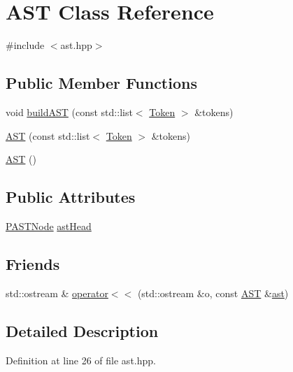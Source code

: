 \hypertarget{class_a_s_t}{}\section{A\+S\+T Class Reference}
\label{class_a_s_t}


{\ttfamily \#include $<$ast.\+hpp$>$}

\subsection*{Public Member Functions}
\begin{DoxyCompactItemize}
\item 
void \hyperlink{class_a_s_t_a8fe6207ce46b87c2febdc6ebdf0be6dd}{build\+A\+S\+T} (const std\+::list$<$ \hyperlink{struct_token}{Token} $>$ \&tokens)
\item 
\hyperlink{class_a_s_t_a2daa6c636071ad4e888897a93e3dd380}{A\+S\+T} (const std\+::list$<$ \hyperlink{struct_token}{Token} $>$ \&tokens)
\item 
\hyperlink{class_a_s_t_afd378ca7cb3049d6293e8597d31d758d}{A\+S\+T} ()
\end{DoxyCompactItemize}
\subsection*{Public Attributes}
\begin{DoxyCompactItemize}
\item 
\hyperlink{ast_8hpp_ab65291a3ef1ea9ec8e3d396783b77e46}{P\+A\+S\+T\+Node} \hyperlink{class_a_s_t_a4f9b6d3be381682515e1e51c176b1c21}{ast\+Head}
\end{DoxyCompactItemize}
\subsection*{Friends}
\begin{DoxyCompactItemize}
\item 
std\+::ostream \& \hyperlink{class_a_s_t_a92b9f335ac976192dab86fc6b59d357b}{operator$<$$<$} (std\+::ostream \&o, const \hyperlink{class_a_s_t}{A\+S\+T} \&\hyperlink{cli_8cpp_a3cc5b76560a60268fc81bfce22b51bf7}{ast})
\end{DoxyCompactItemize}


\subsection{Detailed Description}


Definition at line 26 of file ast.\+hpp.



